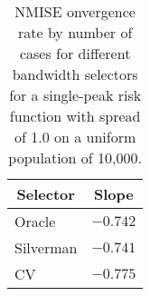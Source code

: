 \begin{table}[htbp]
\begin{center}
\begin{tabular}{lr}
\hline\hline
\multicolumn{1}{c}{Selector}&\multicolumn{1}{c}{Slope}\tabularnewline
\hline
Oracle&$-0.742$\tabularnewline
Silverman&$-0.741$\tabularnewline
CV&$-0.775$\tabularnewline
\hline
\end{tabular}
\caption[NMISE Convergence rate by number of cases for spread 1.0]{NMISE onvergence rate by number of cases for different bandwidth selectors for a single-peak risk function with spread of 1.0 on a uniform population of 10,000.\label{tab:results:nmise_convergence_by_num_cases}}\end{center}
\end{table}

